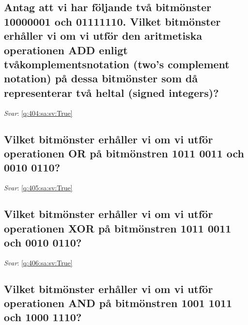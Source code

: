 \documentclass[a4paper,11pt,oneside]{article}
\begin{document}
\begin{sloppypar}
\subsection{Antag att vi har f\"oljande tv\r{a} bitm\"onster 10000001 och 01111110. Vilket bitm\"onster erh\r{a}ller vi om vi utf\"or den aritmetiska operationen ADD enligt tv\r{a}komplementsnotation (two{\textquoteright}s complement notation) p\r{a} dessa bitm\"onster som d\r{a} representerar tv\r{a} heltal (signed integers)?}

\label{q:404:sa:sv:False}

\vspace{2cm}

\noindent\makebox[\textwidth]{\hrulefill}

\vspace{1cm}

\textit{Svar}: \autoref{q:404:sa:sv:True}



\subsection{Vilket bitm\"onster erh\r{a}ller vi om vi utf\"or operationen OR p\r{a} bitm\"onstren 1011 0011 och 0010 0110?}

\label{q:405:sa:sv:False}

\vspace{2cm}

\noindent\makebox[\textwidth]{\hrulefill}

\vspace{1cm}

\textit{Svar}: \autoref{q:405:sa:sv:True}



\subsection{Vilket bitm\"onster erh\r{a}ller vi om vi utf\"or operationen XOR p\r{a} bitm\"onstren 1011 0011 och 0010 0110?}

\label{q:406:sa:sv:False}

\vspace{2cm}

\noindent\makebox[\textwidth]{\hrulefill}

\vspace{1cm}

\textit{Svar}: \autoref{q:406:sa:sv:True}



\subsection{Vilket bitm\"onster erh\r{a}ller vi om vi utf\"or operationen AND p\r{a} bitm\"onstren 1001 1011 och 1000 1110?}


\end{sloppypar}
\end{document}
